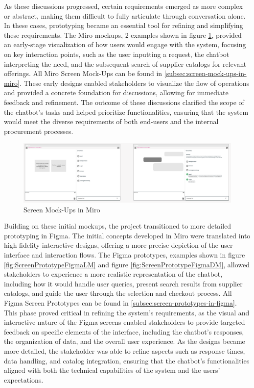 As these discussions progressed, certain requirements emerged as more complex or abstract, making them difficult to
fully articulate through conversation alone. In these cases, prototyping became an essential tool for refining and
simplifying these requirements. The Miro mockups, 2 examples shown in figure \ref{fig:ScreenMock-UpsinMiro}, provided an
early-stage visualization of how users would engage with the system, focusing on key interaction points, such as the
user inputting a request, the chatbot interpreting the need, and the subsequent search of supplier catalogs for relevant
offerings. All Miro Screen Mock-Ups can be found in \ref{subsec:screen-mock-ups-in-miro}. These early designs enabled
stakeholders to visualize the flow of operations and provided a concrete foundation for discussions, allowing for
immediate feedback and refinement. The outcome of these discussions clarified the scope of the chatbot's tasks and
helped prioritize functionalities, ensuring that the system would meet the diverse requirements of both end-users and
the internal procurement processes.

\begin{figure}[H]
    \centering
    \caption[Screen Mock-Ups in Miro]{Screen Mock-Ups in Miro \footnotemark}
    \label{fig:ScreenMock-UpsinMiro}
    \includegraphics[width=1\textwidth]{abbildungen/RE/Miro/Miro_Mockups}
\end{figure}

Building on these initial mockups, the project transitioned to more detailed prototyping in Figma. The initial concepts
developed in Miro were translated into high-fidelity interactive designs, offering a more precise depiction of the user
interface and interaction flows. The Figma prototypes, examples shown in figure \ref{fig:ScreenPrototypeFigmaLM} and
figure \ref{fig:ScreenPrototypeFigmaDM}, allowed stakeholders to experience a more realistic representation
of the chatbot, including how it would handle user queries, present search results from supplier catalogs, and guide the
user through the selection and checkout process. All Figma Screen Prototypes can be found in
\ref{subsec:screen-prototypes-in-figma}. This phase proved critical in refining the system’s requirements, as
the visual and interactive nature of the Figma screens enabled stakeholders to provide targeted feedback on specific
elements of the interface, including the chatbot’s responses, the organization of data, and the overall user experience.
As the designs became more detailed, the stakeholder was able to refine aspects such as response times, data handling,
and catalog integration, ensuring that the chatbot’s functionalities aligned with both the technical capabilities of the
system and the users’ expectations.

